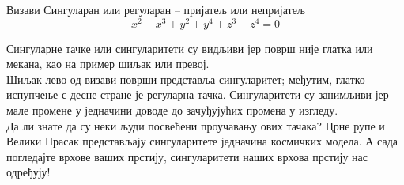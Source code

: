\begin{surferPage}{Визави}
Сингуларан или регуларан – пријатељ или непријатељ\\
\smallskip
\[x^2	- x^3+ y^2+ y^4+ z^3- z^4	=  0\]

\vspace{0.3cm}
Сингуларне тачке или сингуларитети су видљиви јер површ није глатка или мекана, као на пример шиљак или превој.\\
\vspace{0.3cm}
Шиљак лево од визави површи представља сингуларитет; међутим, глатко испупчење с десне стране је регуларна тачка. Сингуларитети су занимљиви јер мале промене у једначини доводе до зачуђујућих промена у изгледу. \\

\vspace{0.3cm}
Да ли знате да су неки људи посвећени проучавању ових тачака? Црне рупе и Велики Прасак представљају сингуларитете једначина космичких модела. А сада погледајте врхове ваших прстију, сингуларитети наших врхова прстију нас одређују!
\end{surferPage}
